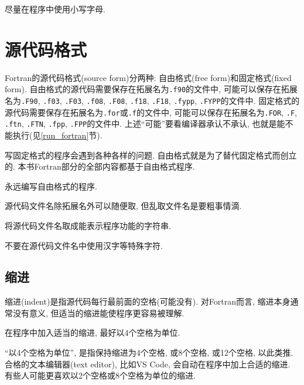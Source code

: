 \begin{principle}
    尽量在程序中使用小写字母.
\end{principle}

\section{源代码格式}

Fortran的源代码格式(source form)分两种: 自由格式(free form)和固定格式(fixed form). 自由格式的源代码需要保存在拓展名为\verb|.f90|的文件中, 可能可以保存在拓展名为\verb|.F90|, \verb|.f03|, \verb|.F03|, \verb|.f08|, \verb|.F08|, \verb|.f18|, \verb|.F18|, \verb|.fypp|, \verb|.FYPP|的文件中. 固定格式的源代码需要保存在拓展名为\verb|.for|或\verb|.f|的文件中, 可能可以保存在拓展名为\verb|.FOR|, \verb|.F|, \verb|.ftn|, \verb|.FTN|, \verb|.fpp|, \verb|.FPP|的文件中. 上述``可能''要看编译器承认不承认, 也就是能不能执行(见\ref{run_fortran}节).

写固定格式的程序会遇到各种各样的问题. 自由格式就是为了替代固定格式而创立的. 本书Fortran部分的全部内容都基于自由格式程序.

\begin{principle}
    永远编写自由格式的程序.
\end{principle}

源代码文件名除拓展名外可以随便取, 但乱取文件名是要粗事情滴.

\begin{principle}
    将源代码文件名取成能表示程序功能的字符串.
\end{principle}

\begin{principle}
    不要在源代码文件名中使用汉字等特殊字符.
\end{principle}

\subsection{缩进}

缩进(indent)是指源代码每行最前面的空格(可能没有). 对Fortran而言, 缩进本身通常没有意义, 但适当的缩进能使程序更容易被理解.

\begin{principle}\label{fortran_indent}
    在程序中加入适当的缩进, 最好以$4$个空格为单位.
\end{principle}

``以4个空格为单位'', 是指保持缩进为4个空格, 或8个空格, 或12个空格, 以此类推. 合格的文本编辑器(text editor), 比如VS Code, 会自动在程序中加上合适的缩进. 有些人可能更喜欢以2个空格或8个空格为单位的缩进.

